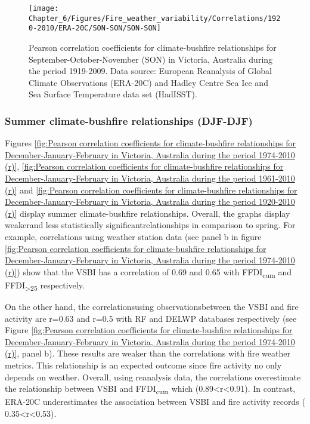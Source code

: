 \begin{figure}[h]
\noindent \begin{centering}
\texttt{[image: Chapter\_6/Figures/Fire\_weather\_variability/Correlations/1920-2010/ERA-20C/SON-SON/SON-SON]}
\par\end{centering}

\caption[Pearson correlation coefficients for climate-bushfire relationships
for September-October-November (SON) in Victoria, Australia during
the period 1919-2009]{Pearson correlation coefficients for climate-bushfire relationships
for September-October-November (SON) in Victoria, Australia during
the period 1919-2009. Data source: European Reanalysis of Global Climate
Observations (ERA-20C) and Hadley Centre Sea Ice and Sea Surface Temperature
data set (HadISST). \label{fig:Pearson correlation coefficients for climate-bushfire relationships for September-October-November in Victoria, Australia during the period 1919-2009 (r)}}
\end{figure}



\subsubsection{Summer climate-bushfire relationships (DJF-DJF)}

Figures \ref{fig:Pearson correlation coefficients for climate-bushfire relationships for December-January-February in Victoria, Australia during the period 1974-2010 (r)},
\ref{fig:Pearson correlation coefficients for climate-bushfire relationships for December-January-February in Victoria, Australia during the period 1961-2010 (r)}
and \ref{fig:Pearson correlation coefficients for climate-bushfire relationships for December-January-February in Victoria, Australia during the period 1920-2010 (r)}
display summer climate-bushfire relationships. Overall, the graphs
display weaker\textemdash and less statistically significant\textemdash relationships
in comparison to spring. For example, correlations using weather station
data (see panel b in figure \ref{fig:Pearson correlation coefficients for climate-bushfire relationships for December-January-February in Victoria, Australia during the period 1974-2010 (r)})
show that the VSBI has a correlation of 0.69 and 0.65 with FFDI\textsubscript{cum}
and FFDI\textsubscript{>25 }respectively.

On the other hand, the correlations\textemdash using observations\textemdash between
the VSBI and fire activity are r=0.63 and r=0.5 with RF and DELWP
databases respectively (see Figure \ref{fig:Pearson correlation coefficients for climate-bushfire relationships for December-January-February in Victoria, Australia during the period 1974-2010 (r)},
panel b). These results are weaker than the correlations with fire
weather metrics. This relationship is an expected outcome since fire
activity no only depends on weather. Overall, using reanalysis data,
the correlations overestimate the relationship between VSBI and FFDI\textsubscript{cum}
which (0.89<r<0.91). In contrast, ERA-20C underestimates the association
between VSBI and fire activity records ( 0.35<r<0.53).

